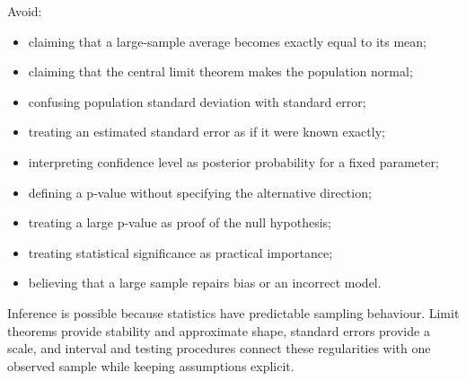 Avoid:
\begin{itemize}
    \item claiming that a large-sample average becomes exactly equal to its mean;
    \item claiming that the central limit theorem makes the population normal;
    \item confusing population standard deviation with standard error;
    \item treating an estimated standard error as if it were known exactly;
    \item interpreting confidence level as posterior probability for a fixed
    parameter;
    \item defining a p-value without specifying the alternative direction;
    \item treating a large p-value as proof of the null hypothesis;
    \item treating statistical significance as practical importance;
    \item believing that a large sample repairs bias or an incorrect model.
\end{itemize}

\begin{summarybox}
Inference is possible because statistics have predictable sampling behaviour.
Limit theorems provide stability and approximate shape, standard errors provide a
scale, and interval and testing procedures connect these regularities with one
observed sample while keeping assumptions explicit.
\end{summarybox}
